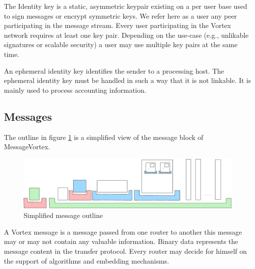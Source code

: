 \documentclass[10pt,journal,compsoc]{IEEEtran}
\let\MYoriglatexcaption\caption
\renewcommand{\caption}[2][\relax]{\MYoriglatexcaption[#2]{#2}}
\begin{document}
The Identity key is a static, asymmetric keypair existing on a per user base used to sign messages or encrypt symmetric keys. We refer here as a user any peer participating in the message stream. Every user participating in the Vortex network requires at least one key pair. Depending on the use-case (e.g., unlikable signatures or scalable security) a user may use multiple key pairs at the same time.

An ephemeral identity key identifies the sender to a processing host. The ephemeral identity key must be handled in such a way that it is not linkable. It is mainly used to process accounting information.

\subsection{Messages}
The outline in figure \ref{fig:messageOutline} is a simplified view of the message block of MessageVortex.

\begin{figure}[ht]
	\includegraphics[width=\textwidth]{../../inc/blockLayoutSimplified}
	\caption{Simplified message outline}
	\label{fig:messageOutline}
\end{figure}

A Vortex message is a message passed from one router to another this message may or may not contain any valuable information. Binary data represents the message content in the transfer protocol. Every router may decide for himself on the support of algorithms and embedding mechanisms.
\end{document}
